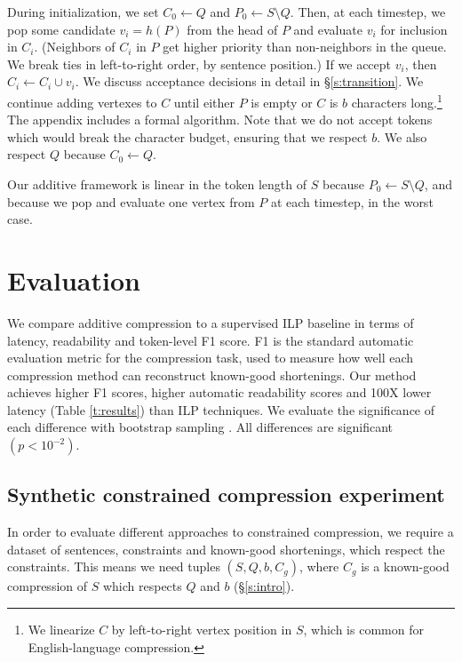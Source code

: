 \documentclass[11pt,a4paper]{article}
\begin{document}
During initialization, we set $C_0 \gets Q$ and $P_0 \gets S \setminus Q$. Then, at each timestep, we pop some candidate $v_i =h(P)$ from the head of $P$ and evaluate $v_i$ for inclusion in $C_i$. (Neighbors of $C_i$ in $P$ get higher priority than non-neighbors in the queue. We break ties in left-to-right order, by sentence position.) If we accept $v_i$, then $C_i \gets C_i \cup v_i$. We discuss acceptance decisions in detail in \S\ref{s:transition}. We continue adding vertexes to $C$ until either $P$ is empty or $C$ is $b$ characters long.\footnote{We linearize $C$ by left-to-right vertex position in $S$, which is common for English-language compression.} The appendix includes a formal algorithm. Note that we do not accept tokens which would break the character budget, ensuring that we respect $b$. We also respect $Q$ because $C_0 \gets Q$. 

Our additive framework is linear in the token length of $S$ because $P_0  \gets S \setminus Q$, and because we pop and evaluate one vertex from $P$ at each timestep, in the worst case.

\section{Evaluation}\label{s:autoeval}

We compare additive compression to a supervised ILP baseline in terms of latency, readability and token-level F1 score. F1 is the standard automatic evaluation metric for the compression task, used to measure how well each compression method can reconstruct known-good shortenings. Our method achieves higher F1 scores, higher automatic readability scores and 100X lower latency (Table \ref{t:results}) than ILP techniques. We evaluate the significance of each difference with bootstrap sampling \cite{D12-1091}. All differences are significant {\small $(p < 10^{-2})$}. 

\subsection{Synthetic constrained compression experiment}\label{s:constrained}

In order to evaluate different approaches to constrained compression, we require a dataset of sentences, constraints and known-good shortenings, which respect the constraints. This means we need tuples $(S, Q, b, C_g)$, where $C_g$ is a known-good compression of $S$ which respects $Q$ and $b$ (\S\ref{s:intro}).
\end{document}
